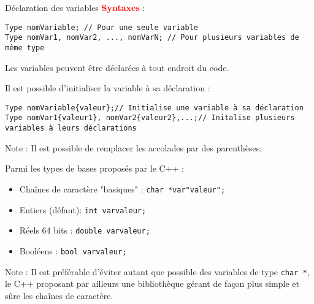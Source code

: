 \documentclass[compress,10pt,aspectratio=169]{beamer}
\begin{document}
\begin{frame}[fragile]{Déclaration des variables}
\scriptsize
    \textbf{\textcolor{red}{Syntaxes}} :
\begin{verbatim}
Type nomVariable; // Pour une seule variable
Type nomVar1, nomVar2, ..., nomVarN; // Pour plusieurs variables de même type
\end{verbatim}

    Les variables peuvent être déclarées à tout endroit du code.

    Il est possible d'initialiser la variable à sa déclaration :
\begin{verbatim}
Type nomVariable{valeur};// Initialise une variable à sa déclaration
Type nomVar1{valeur1}, nomVar2{valeur2},...;// Initalise plusieurs variables à leurs déclarations
\end{verbatim}

\alert{Note} : Il est possible de remplacer les accolades par des parenthèses;

Parmi les types de bases proposés par le C++ :
\begin{multicols}{3}
  \begin{itemize}
  \item Chaînes de caractère "basiques" : \texttt{char *var{"valeur"};}
  \item Entiers (défaut): \texttt{int var{valeur};}
  \item Réels 64 bits : \texttt{double var{valeur};}
  \item Booléens : \texttt{bool var{valeur};}
\end{itemize}
\end{multicols}
\vspace*{-3mm}
\alert{Note} : Il est préférable d'éviter autant que possible des variables de type \texttt{char *}, le C++ proposant par ailleurs une bibliothèque gérant de façon plus
    simple et sûre les chaînes de caractère.
\end{frame}
\end{document}
